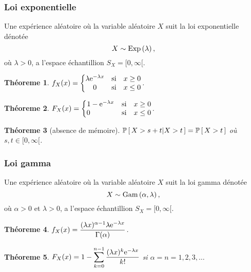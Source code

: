 \documentclass[11pt]{article}
\renewcommand\P[1]{%
	\ensuremath{%
		\mathbb{P}\left[\,#1\,\right]%
	}%
}%
\newcommand\Pg[2]{%
	\ensuremath{%
		\mathbb{P}\left[\,#1\middle\rvert#2\,\right]%
	}%
}%
\newcommand\e{%
	\ensuremath{%
		\mathrm{e}%
	}%
}%
\newcommand\Exp[1]{%
	\ensuremath{%
		\mathrm{Exp}\left(#1\right)%
	}%
}%
\newcommand\Gam[2]{%
	\ensuremath{%
		\mathrm{Gam}\left(#1,#2\right)%
	}%
}%
\newtheorem{theoreme}{Théoreme}[section]
\begin{document}
\subsubsection{Loi exponentielle}
Une expérience aléatoire où la variable aléatoire $X$ suit la loi exponentielle
dénotée
\begin{equation*}
	X\sim\Exp{\lambda},
\end{equation*}
où $\lambda>0$, a l'espace échantillion $S_X=[0,\infty[$.

\begin{theoreme}
	$f_X(x)=\left\{
		\begin{matrix}
			\lambda\e^{-\lambda x} &\text{si}& x\geq 0\\
			0                      &\text{si}& x\leq 0\\
		\end{matrix}
	\right.$.
\end{theoreme}

\begin{theoreme}
	$F_X(x)=\left\{
		\begin{matrix}
			1         -\e^{-\lambda x}      &\text{si}& x\geq 0\\
			0\phantom{-\e^{-\lambda x}}\;\; &\text{si}& x\leq 0\\
		\end{matrix}
	\right.$.
\end{theoreme}

\begin{theoreme}[absence de mémoire]
	$\Pg{X>s+t}{X>t}=\P{X>t}$ où $s,t\in[0,\infty[$.
\end{theoreme}

\subsubsection{Loi gamma}
Une expérience aléatoire où la variable aléatoire $X$ suit la loi gamma dénotée
\begin{equation*}
	X\sim\Gam{\alpha}{\lambda},
\end{equation*}
où $\alpha>0$ et $\lambda>0$, a l'espace échantillion $S_X=[0,\infty[$.

\begin{theoreme}
	$f_X(x)
	=\dfrac{(\lambda x)^{\alpha-1}\lambda\e^{-\lambda x}}{\Gamma(\alpha)}$.
\end{theoreme}

\begin{theoreme}
	$F_X(x)=1-\displaystyle\sum_{k=0}^{n-1}
		\dfrac{(\lambda x)^k\e^{-\lambda x}}{k!}$
	si $\alpha=n=1,2,3,\dots$
\end{theoreme}
\end{document}
